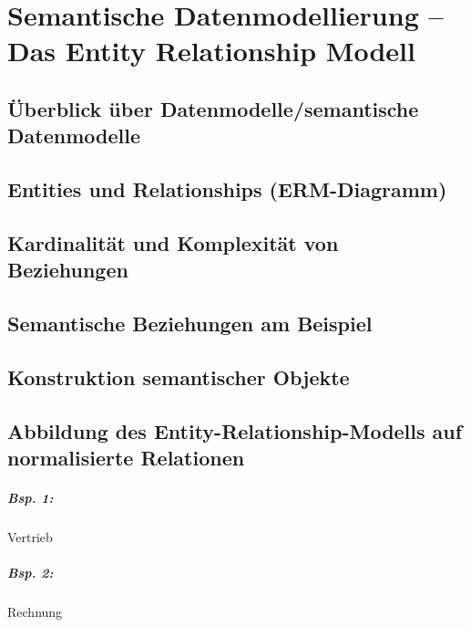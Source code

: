 \section{Semantische Datenmodellierung -- Das Entity Relationship Modell}

\subsection{Überblick über Datenmodelle/semantische Datenmodelle}
\subsection{Entities und Relationships (ERM-Diagramm)}
\subsection{Kardinalität und Komplexität von Beziehungen}
\subsection{Semantische Beziehungen am Beispiel}
\subsection{Konstruktion semantischer Objekte}
\subsection{Abbildung des Entity-Relationship-Modells auf normalisierte Relationen}
\subparagraph{Bsp. 1:} Vertrieb
\subparagraph{Bsp. 2:} Rechnung


